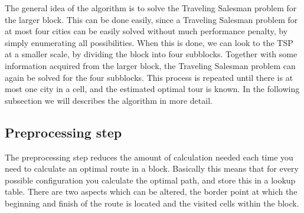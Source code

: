 The general idea of the algorithm is to solve the Traveling Salesman problem for the larger block. This can be done easily, since a Traveling Salesman problem for at most four cities can be easily solved without much performance penalty, by simply enumerating all possibilities. When this is done, we can look to the TSP at a smaller scale, by dividing the block into four subblocks. Together with some information acquired from the larger block, the Traveling Salesman problem can again be solved for the four subblocks. This process is repeated until there is at most one city in a cell, and the estimated optimal tour is known. In the following subsection we will describes the algorithm in more detail.

\subsection{Preprocessing step}

The preprocessing step reduces the amount of calculation needed each time you need to calculate an optimal route in a block. Basically this means that for every possible configuration you calculate the optimal path, and store this in a lookup table. There are two aspects which can be altered, the border point at which the beginning and finish of the route is located and the visited cells within the block.

